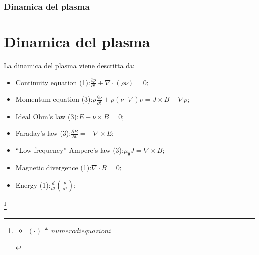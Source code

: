 \documentclass{beamer}
\begin{document}
	\begin{frame}
	\frametitle{Dinamica del plasma}
	\section{Dinamica del plasma}
	La dinamica del plasma viene descritta da:
	\begin{itemize}
		\item Continuity equation (1):\(\frac{\partial\rho}{\partial t}+\nabla\cdot(\rho \nu)=0\);
		\item Momentum equation (3):\(\rho \frac{\partial\nu}{\partial t}+\rho(\nu\cdot\nabla)\nu=J\times B-\nabla p\);
		\item Ideal Ohm's law (3):\(E+\nu\times B=0\);
		\item Faraday's law (3):\(\frac{\partial B}{\partial t}=-\nabla\times E\);%
		\item ``Low frequency'' Ampere's law (3):\(\mu_{0}J=\nabla\times B\);%
		\item Magnetic divergence (1):\(\nabla\cdot B=0\);
		\item Energy (1):\(\frac{d}{dt}(\frac{p}{\rho^{\gamma}})\);
	\end{itemize}
	\footnote{\scriptsize\begin{itemize}
			\item \((\cdot)\triangleq  numero di equazioni\)
		\end{itemize}}
\end{frame}
\end{document}
